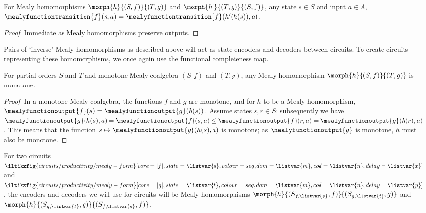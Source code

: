 \begin{lemma}
    For Mealy homomorphisms \(\morph{h}{(S,f)}{(T,g)}\) and
    \(\morph{h^\prime}{(T,g)}{(S,f)}\), any state \(s \in S\) and input
    \(a \in A\), \(
    \mealyfunctiontransition{f}(s, a)
    =
    \mealyfunctiontransition{f}(h^\prime(h(s)), a)
    \).
\end{lemma}
\begin{proof}
    Immediate as Mealy homomorphisms preserve outputs.
\end{proof}

Pairs of `inverse' Mealy homomorphisms as described above will act as state
encoders and decoders between circuits.
To create circuits representing these homomorphisms, we once again use the
functional completeness map.

\begin{lemma}
    For partial orders \(S\) and \(T\) and monotone Mealy coalgebra
    \((S,f)\) and \((T,g)\), any Mealy homomorphism \(\morph{h}{(S,f)}{(T,g)}\)
    is monotone.
\end{lemma}
\begin{proof}
    In a monotone Mealy coalgebra, the functions \(f\) and \(g\) are monotone,
    and for \(h\) to be a Mealy homomorphism, \(
    \mealyfunctionoutput{f}(s)
    =
    \mealyfunctionoutput{g}(h(s))
    \).
    Assume states \(s,r \in S\); subsequently we have \(
    \mealyfunctionoutput{g}(h(s), a)
    =
    \mealyfunctionoutput{f}(s, a)
    \leq
    \mealyfunctionoutput{f}(r, a)
    =
    \mealyfunctionoutput{g}(h(r), a)
    \).
    This means that the function \(
    s \mapsto \mealyfunctionoutput{g}(h(s), a)
    \) is monotone; as \(\mealyfunctionoutput{g}\) is monotone, \(h\) must
    also be monotone.
\end{proof}

For two circuits \(
\iltikzfig{circuits/productivity/mealy-form}[core=|f|,state=\listvar{s},colour=seq,dom=\listvar{m},cod=\listvar{n},delay=\listvar{x}]
\) and \(
\iltikzfig{circuits/productivity/mealy-form}[core=|g|,state=\listvar{t},colour=seq,dom=\listvar{m},cod=\listvar{n},delay=\listvar{y}]
\), the encoders and decoders we will use for circuits will be Mealy homomorphisms
\(\morph{h}{(S_{f,\listvar{s}},f)}{(S_{g,\listvar{t}},g)}\)
and
\(\morph{h}{(S_{g,\listvar{t}},g)}{(S_{f,\listvar{s}},f)}\).


